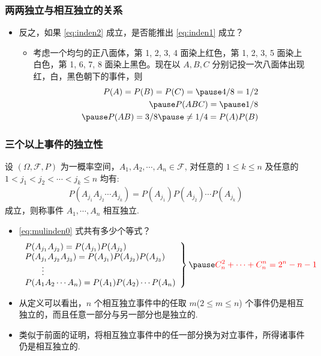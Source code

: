 		\begin{frame}
			\frametitle{两两独立与相互独立的关系}
			\begin{itemize}[<+-|alert@+>]
		\item 反之，如果 \eqref{eq:inden2} 成立，是否能推出 \eqref{eq:inden1} 成立？
		\begin{itemize}[<+-|alert@+>]
			\item 考虑一个均匀的正八面体，第 1, 2, 3, 4 面染上红色，第 1, 2, 3, 5 面染上白色，第 1, 6, 7, 8 面染上黑色。现在以 $A,B,C$ 分别记投一次八面体出现红，白，黑色朝下的事件，则 \pause
			\begin{eqnarray*}
				P(A)=P(B)=P(C)=\pause 4/8=1/2\\ \pause
				P(ABC)=\pause 1/8   \\ \pause
				P(AB)=3/8\pause \neq 1/4=P(A)P(B)
			\end{eqnarray*}
		\end{itemize}
	\end{itemize}
\end{frame}

\begin{frame}
	\frametitle{三个以上事件的独立性}
	\begin{defi}
		设 $(\Omega,\mathcal{F}, P)$ 为一概率空间，$A_1,A_2,\cdots,A_n\in\mathcal{F}$, 对任意的 $1\le k\le n$ 及任意的 $1< j_1<j_2<\cdots<j_k\leq n$ 均有:
		\begin{eqnarray}\label{eq:mulinden0}
			P(A_{j_1}A_{j_2}\cdots A_{j_k})=P(A_{j_1})P(A_{j_2})\cdots P(A_{j_k})
		\end{eqnarray}
		成立，则称事件 $A_1,\cdots, A_n$ 相互独立.
	\end{defi}
	\pause
	\begin{itemize}[<+-|alert@+>]
		\item \eqref{eq:mulinden0} 式共有多少个等式？\pause
		\begin{eqnarray}
			\label{eq:mulinden}
			\left.\begin{array}{l}
				P(A_{j_1}A_{j_2})=P(A_{j_1})P(A_{j_2})\\
				P(A_{j_1}A_{j_2}A_{j_3})=P(A_{j_1})P(A_{j_2})P(A_{j_3}) \\
				\qquad \vdots\\
				P(A_1A_2\cdots A_n)=P(A_1)P(A_2)\cdots P(A_n)
			\end{array}\right\} \pause \textcolor{red}{C_n^2+\cdots+C_n^n=2^n-n-1}
		\end{eqnarray}
		\pause
		\item 从定义可以看出，$n$ 个相互独立事件中的任取 $m$($2\le m\le n$) 个事件仍是相互独立的，而且任意一部分与另一部分也是独立的.
		\item 类似于前面的证明，将相互独立事件中的任一部分换为对立事件，所得诸事件仍是相互独立的.
	\end{itemize}



\end{frame}

